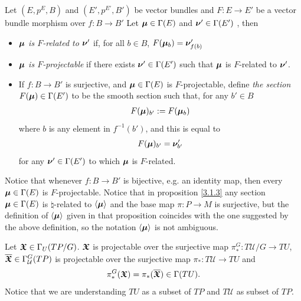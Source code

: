 \begin{definition}\label{defnRelatedProjectable}
Let $(E, p^E, B)$ and $(E', p^{E'}, B')$ be vector bundles and $F: E \to E'$ be a vector bundle morphism over $f: B \to B'$ Let $\bm{\mu} \in \Gamma(E)$ and $\bm{\nu}' \in \Gamma(E')$ , then
    \begin{itemize}
        
    \item \emph{$\bm{\mu}$ is $F$-related to $\bm{\nu}'$} if, for all $b \in B$, $F(\bm{\mu}_b) = \bm{\nu}'_{f(b)}$
    
    \item \emph{$\bm{\mu}$ is $F$-projectable} if there exists $\bm{\nu}' \in \Gamma(E')$ such that $\bm{\mu}$ is $F$-related to $\bm{\nu}'$.
    
    \item If $f:B \to B'$ is surjective, and $\bm{\mu} \in \Gamma(E)$ is $F$-projectable, define \emph{the section $F(\bm{\mu}) \in \Gamma(E')$} to be the smooth section such that, for any $b' \in B$
    \begin{align} \label{funOfSection}
        F(\bm{\mu})_{b'} := F(\bm{\mu}_b)
    \end{align} where $b$ is any element in $f^{-1}(b')$, and this is equal to \[F(\bm{\mu})_{b'} = \bm{\nu}'_{b'}\] for any $\bm{\nu}' \in \Gamma(E')$ to which $\bm{\mu}$ is $F$-related.
    
    \end{itemize}

Notice that whenever $f: B \to B'$ is bijective, e.g. an identity map, then every $\bm{\mu} \in \Gamma(E)$ is $F$-projectable. Notice that in proposition \ref{3.1.3} any section $\bm{\mu} \in \Gamma(E)$ is $\natural$-related to $\left\langle \bm{\mu} \right\rangle$ and the base map $\pi:P \to M$ is surjective, but the definition of $\left\langle \bm{\mu} \right\rangle$ given in that proposition coincides with the one suggested by the above definition, so the notation $\left\langle \bm{\mu} \right\rangle$ is not ambiguous.

\end{definition}

\begin{theorem} \label{theoAnchorUpsect}
Let $\bm{\mathfrak{X}} \in \Gamma_U(TP/G)$. $\bm{\mathfrak{X}}$ is projectable over the surjective map $\pi_*^G: T\mathcal U/G \to TU$, $\overline{\bm{\bm{\mathfrak{X}}}} \in \Gamma^G_{\mathcal U}(TP)$ is projectable over the surjective map $\pi_*: T\mathcal U \to TU$ and
\begin{align} \label{theoAnchorUpsectEqn}
    \pi^G_*(\bm{\mathfrak{X}}) = \pi_*(\overline{\bm{\bm{\mathfrak{X}}}}) \in \Gamma(TU).
\end{align}
Notice that we are understanding $TU$ as a subset of $TP$ and $T\mathcal U$ as subset of $TP$.
\end{theorem}

